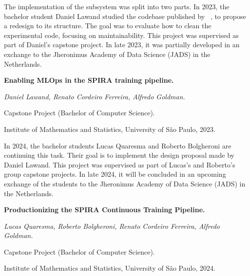  The implementation of the 
  subsystem was split into two parts. In 2023, the bachelor student
  Daniel Lawand studied the codebase published by
  \citeauthor{Casanova2021DeepSpeech}~\parencite{Casanova2021DeepSpeech},
  to propose a redesign to its structure. The goal was to evaluate how
  to clean the experimental code, focusing on maintainability.
  This project was supervised as part of Daniel's capstone project.
  In late 2023, it was partially developed in an exchange
  to the Jheronimus Academy of Data Science (JADS) in the Netherlands.
  \begin{supervision}
    \label{sup:tcc_daniel}
    \noindent\textbf{%
      Enabling MLOps in the SPIRA training pipeline.
    }
  
    \noindent%
    \emph{%
      Daniel Lawand,
      Renato Cordeiro Ferreira,
      Alfredo Goldman.
    }
  
    \noindent%
    Capstone Project (Bachelor of Computer Science).
  
    \noindent%
    Institute of Mathematics and Statistics, University of São Paulo, 2023.
  \end{supervision}
  
  In 2024, the bachelor students Lucas Quaresma and Roberto Bolgheroni
  are continuing this task. Their goal is to implement the design proposal
  made by Daniel Lawand. This project was supervised as part of Lucas's
  and Roberto's group capstone projects. In late 2024, it will be concluded
  in an upcoming exchange of the students to the Jheronimus Academy of
  Data Science (JADS) in the Netherlands.
  \begin{supervision}
    \label{sup:tcc_lucas_roberto}
    \noindent\textbf{%
      Productionizing the SPIRA Continuous Training Pipeline.
    }
  
    \noindent%
    \emph{%
      Lucas Quaresma,
      Roberto Bolgheroni,
      Renato Cordeiro Ferreira,
      Alfredo Goldman.
    }
  
    \noindent%
    Capstone Project (Bachelor of Computer Science).
  
    \noindent%
    Institute of Mathematics and Statistics, University of São Paulo, 2024.
  \end{supervision}
  
